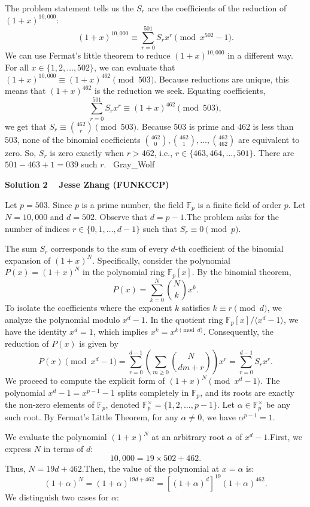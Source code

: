 \begin{enumerate}
 The problem statement tells us the $S_r$ are the coefficients of the reduction of $(1 + x)^{10,000}$:
 \[(1 + x)^{10,000} \equiv \sum_{r = 0}^{501} S_r x^r \pmod{x^{502} - 1}.\]We can use Fermat's little theorem to reduce $(1 + x)^{10,000}$ in a different way. For all $x \in \{1, 2, \dots, 502\}$, we can evaluate that $(1 + x)^{10,000} \equiv (1 + x)^{462} \pmod{503}$. Because reductions are unique, this means that $(1 + x)^{462}$ is the reduction we seek. Equating coefficients,
 \[\sum_{r = 0}^{501} S_r x^r \equiv (1 + x)^{462} \pmod{503},\]we get that $S_r \equiv \binom{462}{r} \pmod{503}$. Because $503$ is prime and $462$ is less than $503$, none of the binomial coefficients $\binom{462}{0}, \binom{462}{1}, \dots, \binom{462}{462}$ are equivalent to zero. So, $S_r$ is zero exactly when $r > 462$, i.e., $r \in \{463, 464, \dots, 501\}$. There are $501 - 463 + 1 = \boxed{039}$ such $r$. ~Gray\_Wolf

 



\textbf{Solution 2 ~ Jesse Zhang (FUNKCCP)}

Let $p = 503$. Since $p$ is a prime number, the field $\mathbb{F}_p$ is a finite field of order $p$. Let $N = 10,000$ and $d = 502$. Observe that $d = p - 1$.The problem asks for the number of indices $r \in \{0, 1, \dots, d-1\}$ such that $S_r \equiv 0 \pmod{p}$.

 The sum $S_r$ corresponds to the sum of every $d$-th coefficient of the binomial expansion of $(1+x)^N$. Specifically, consider the polynomial $P(x) = (1+x)^N$ in the polynomial ring $\mathbb{F}_p[x]$. By the binomial theorem,
 \[P(x) = \sum_{k=0}^N \binom{N}{k} x^k.\]To isolate the coefficients where the exponent $k$ satisfies $k \equiv r \pmod{d}$, we analyze the polynomial modulo $x^d - 1$. In the quotient ring $\mathbb{F}_p[x] / \langle x^d - 1 \rangle$, we have the identity $x^d = 1$, which implies $x^k = x^{k \pmod d}$. Consequently, the reduction of $P(x)$ is given by
 \[P(x) \pmod{x^d - 1} = \sum_{r=0}^{d-1} \left( \sum_{m \ge 0} \binom{N}{dm+r} \right) x^r = \sum_{r=0}^{d-1} S_r x^r.\]We proceed to compute the explicit form of $(1+x)^N \pmod{x^d - 1}$. The polynomial $x^d - 1 = x^{p-1} - 1$ splits completely in $\mathbb{F}_p$, and its roots are exactly the non-zero elements of $\mathbb{F}_p$, denoted $\mathbb{F}_p^\times = \{1, 2, \dots, p-1\}$. Let $\alpha \in \mathbb{F}_p^\times$ be any such root. By Fermat's Little Theorem, for any $\alpha \neq 0$, we have $\alpha^{p-1} = 1$.

 We evaluate the polynomial $(1+x)^N$ at an arbitrary root $\alpha$ of $x^d - 1$.First, we express $N$ in terms of $d$:
 \[10,000 = 19 \times 502 + 462.\]Thus, $N = 19d + 462$.Then, the value of the polynomial at $x = \alpha$ is:
 \[(1+\alpha)^N = (1+\alpha)^{19d + 462} = \left[ (1+\alpha)^d \right]^{19} (1+\alpha)^{462}.\]We distinguish two cases for $\alpha$:


\end{enumerate}
